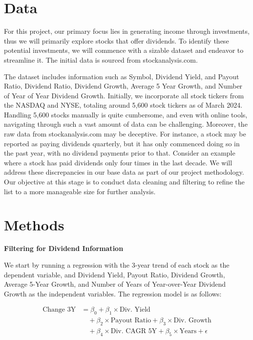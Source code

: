 \documentclass[12pt]{article}
\begin{document}
\section{Data}

For this project, our primary focus lies in generating income through investments, thus we will primarily explore stocks that offer dividends. To identify these potential investments, we will commence with a sizable dataset and endeavor to streamline it. The initial data is sourced from stockanalysis.com.

The dataset includes information such as Symbol, Dividend Yield, and Payout Ratio, Dividend Ratio, Dividend Growth, Average 5 Year Growth, and Number of Year of Year Dividend Growth. Initially, we incorporate all stock tickers from the NASDAQ and NYSE, totaling around 5,600 stock tickers as of March 2024. Handling 5,600 stocks manually is quite cumbersome, and even with online tools, navigating through such a vast amount of data can be challenging. Moreover, the raw data from stockanalysis.com may be deceptive. For instance, a stock may be reported as paying dividends quarterly, but it has only commenced doing so in the past year, with no dividend payments prior to that. Consider an example where a stock has paid dividends only four times in the last decade. We will address these discrepancies in our base data as part of our project methodology. Our objective at this stage is to conduct data cleaning and filtering to refine the list to a more manageable size for further analysis.


\section{Methods}

\textbf{Filtering for Dividend Information}

We start by running a regression with the 3-year trend of each stock as the dependent variable, and Dividend Yield, Payout Ratio, Dividend Growth, Average 5-Year Growth, and Number of Years of Year-over-Year Dividend Growth as the independent variables. The regression model is as follows:

{\small
\[
\begin{aligned}
\text{Change 3Y} &= \beta_0 + \beta_1 \times \text{Div. Yield} \\
&\quad + \beta_2 \times \text{Payout Ratio} + \beta_3 \times \text{Div. Growth} \\
&\quad + \beta_4 \times \text{Div. CAGR 5Y} + \beta_5 \times \text{Years} + \epsilon
\end{aligned}
\]
}
\end{document}
